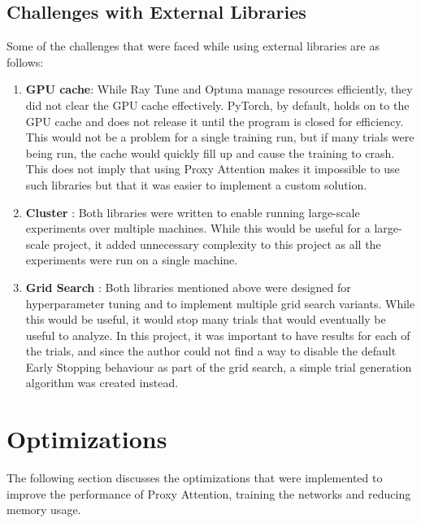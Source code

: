 \subsection{Challenges with External Libraries} \label{sec:challenges_with_external_libraries}
Some of the challenges that were faced while using external libraries are as follows:
\begin{enumerate}
    \item \textbf{GPU cache}: While Ray Tune and Optuna manage resources efficiently, they did not clear the GPU cache effectively. PyTorch, by default, holds on to the GPU cache and does not release it until the program is closed for efficiency. This would not be a problem for a single training run, but if many trials were being run, the cache would quickly fill up and cause the training to crash. This does not imply that using Proxy Attention makes it impossible to use such libraries but that it was easier to implement a custom solution.
    \item \textbf{Cluster} : Both libraries were written to enable running large-scale experiments over multiple machines. While this would be useful for a large-scale project, it added unnecessary complexity to this project as all the experiments were run on a single machine.
    \item \textbf{Grid Search} : Both libraries mentioned above were designed for hyperparameter tuning and to implement multiple grid search variants. While this would be useful, it would stop many trials that would eventually be useful to analyze. In this project, it was important to have results for each of the trials, and since the author could not find a way to disable the default Early Stopping behaviour as part of the grid search, a simple trial generation algorithm was created instead.
\end{enumerate}

\section{Optimizations}
The following section discusses the optimizations that were implemented to improve the performance of Proxy Attention, training the networks and reducing memory usage. 

